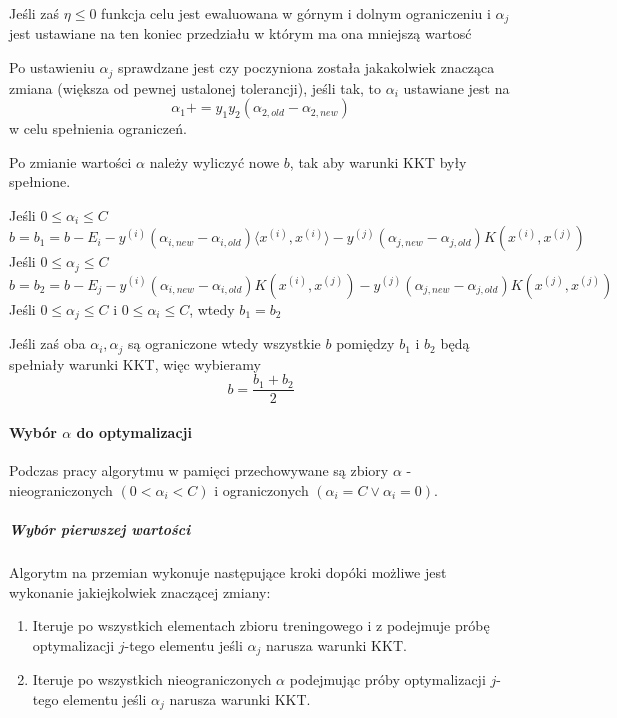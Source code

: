 \documentclass[11pt]{article}
\begin{document}
Jeśli zaś \(\eta \le 0\) funkcja celu jest ewaluowana w górnym i dolnym
ograniczeniu i \(\alpha_j\) jest ustawiane na ten koniec przedziału w
którym ma ona mniejszą wartosć

Po ustawieniu \(\alpha_j\) sprawdzane jest czy poczyniona została
jakakolwiek znacząca zmiana (większa od pewnej ustalonej tolerancji),
jeśli tak, to \(\alpha_i\) ustawiane jest na
\[ \alpha_1 += y_1y_2(\alpha_{2, old} - \alpha_{2, new}) \tag{17}\] w
celu spełnienia ograniczeń.

Po zmianie wartości \(\alpha\) należy wyliczyć nowe \(b\), tak aby
warunki KKT były spełnione.

Jeśli \(0 \le \alpha_i \le C\)
\[ b = b_1 = b - E_i -y^{(i)}(\alpha_{i, new} - \alpha_{i, old}) \langle x^{(i)}, x^{(i)} \rangle -y^{(j)}(\alpha_{j, new} - \alpha_{j, old}) K( x^{(i)}, x^{(j)}) \tag{18}\]
Jeśli \(0 \le \alpha_j \le C\)
\[ b= b_2 = b - E_j -y^{(i)}(\alpha_{i, new} - \alpha_{i, old}) K(x^{(i)}, x^{(j)}) -y^{(j)}(\alpha_{j, new} - \alpha_{j, old}) K(x^{(j)}, x^{(j)}) \tag{19} \]
Jeśli \(0 \le \alpha_j \le C\) i \(0 \le \alpha_i \le C\), wtedy
\(b_1 = b_2\)

Jeśli zaś oba \(\alpha_i, \alpha_j\) są ograniczone wtedy wszystkie
\(b\) pomiędzy \(b_1\) i \(b_2\) będą spełniały warunki KKT, więc
wybieramy \[
b = \frac{b_1 + b_2}{2} \tag{20}
\]

\hypertarget{wybuxf3r-alpha-do-optymalizacji}{%
\paragraph{\texorpdfstring{Wybór \(\alpha\) do
optymalizacji}{Wybór \textbackslash alpha do optymalizacji}}\label{wybuxf3r-alpha-do-optymalizacji}}

Podczas pracy algorytmu w pamięci przechowywane są zbiory \(\alpha\) -
nieograniczonych \(( 0 < \alpha_i < C)\) i ograniczonych
\((\alpha_i = C \lor \alpha_i = 0)\).

\hypertarget{wybuxf3r-pierwszej-wartoux15bci}{%
\subparagraph{Wybór pierwszej
wartości}\label{wybuxf3r-pierwszej-wartoux15bci}}

Algorytm na przemian wykonuje następujące kroki dopóki możliwe jest
wykonanie jakiejkolwiek znaczącej zmiany:

\begin{enumerate}
\def\labelenumi{\arabic{enumi})}
\item
  Iteruje po wszystkich elementach zbioru treningowego i z podejmuje
  próbę optymalizacji \(j\)-tego elementu jeśli \(\alpha_j\) narusza
  warunki KKT.
\item
  Iteruje po wszystkich nieograniczonych \(\alpha\) podejmując próby
  optymalizacji \(j\)-tego elementu jeśli \(\alpha_j\) narusza warunki
  KKT.
\end{enumerate}
\end{document}
